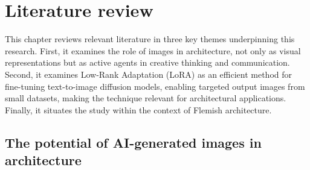 \chapter{Literature review}
This chapter reviews relevant literature in three key themes underpinning this research. First, it examines the role of images in architecture, not only as visual representations but as active agents in creative thinking and communication. Second, it examines Low-Rank Adaptation (LoRA) as an efficient method for fine-tuning text-to-image diffusion models, enabling targeted output images from small datasets, making the technique relevant for architectural applications. Finally, it situates the study within the context of Flemish architecture.

\section{The potential of AI-generated images in architecture}







